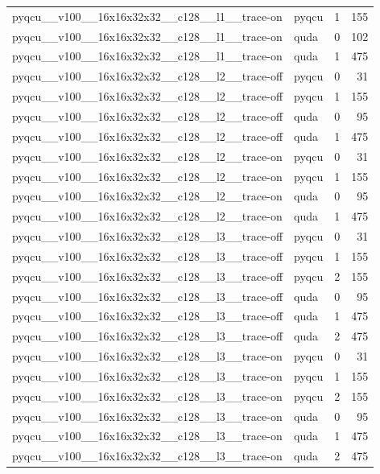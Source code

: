 \begin{table}[htbp]
\begin{tabular}{@{}llrr@{}}
pyqcu\_\_v100\_\_16x16x32x32\_\_c128\_\_l1\_\_trace-on & pyqcu & 1 & 155 \\
pyqcu\_\_v100\_\_16x16x32x32\_\_c128\_\_l1\_\_trace-on & quda & 0 & 102 \\
pyqcu\_\_v100\_\_16x16x32x32\_\_c128\_\_l1\_\_trace-on & quda & 1 & 475 \\
pyqcu\_\_v100\_\_16x16x32x32\_\_c128\_\_l2\_\_trace-off & pyqcu & 0 & 31 \\
pyqcu\_\_v100\_\_16x16x32x32\_\_c128\_\_l2\_\_trace-off & pyqcu & 1 & 155 \\
pyqcu\_\_v100\_\_16x16x32x32\_\_c128\_\_l2\_\_trace-off & quda & 0 & 95 \\
pyqcu\_\_v100\_\_16x16x32x32\_\_c128\_\_l2\_\_trace-off & quda & 1 & 475 \\
pyqcu\_\_v100\_\_16x16x32x32\_\_c128\_\_l2\_\_trace-on & pyqcu & 0 & 31 \\
pyqcu\_\_v100\_\_16x16x32x32\_\_c128\_\_l2\_\_trace-on & pyqcu & 1 & 155 \\
pyqcu\_\_v100\_\_16x16x32x32\_\_c128\_\_l2\_\_trace-on & quda & 0 & 95 \\
pyqcu\_\_v100\_\_16x16x32x32\_\_c128\_\_l2\_\_trace-on & quda & 1 & 475 \\
pyqcu\_\_v100\_\_16x16x32x32\_\_c128\_\_l3\_\_trace-off & pyqcu & 0 & 31 \\
pyqcu\_\_v100\_\_16x16x32x32\_\_c128\_\_l3\_\_trace-off & pyqcu & 1 & 155 \\
pyqcu\_\_v100\_\_16x16x32x32\_\_c128\_\_l3\_\_trace-off & pyqcu & 2 & 155 \\
pyqcu\_\_v100\_\_16x16x32x32\_\_c128\_\_l3\_\_trace-off & quda & 0 & 95 \\
pyqcu\_\_v100\_\_16x16x32x32\_\_c128\_\_l3\_\_trace-off & quda & 1 & 475 \\
pyqcu\_\_v100\_\_16x16x32x32\_\_c128\_\_l3\_\_trace-off & quda & 2 & 475 \\
pyqcu\_\_v100\_\_16x16x32x32\_\_c128\_\_l3\_\_trace-on & pyqcu & 0 & 31 \\
pyqcu\_\_v100\_\_16x16x32x32\_\_c128\_\_l3\_\_trace-on & pyqcu & 1 & 155 \\
pyqcu\_\_v100\_\_16x16x32x32\_\_c128\_\_l3\_\_trace-on & pyqcu & 2 & 155 \\
pyqcu\_\_v100\_\_16x16x32x32\_\_c128\_\_l3\_\_trace-on & quda & 0 & 95 \\
pyqcu\_\_v100\_\_16x16x32x32\_\_c128\_\_l3\_\_trace-on & quda & 1 & 475 \\
pyqcu\_\_v100\_\_16x16x32x32\_\_c128\_\_l3\_\_trace-on & quda & 2 & 475 \\

\end{tabular}
\end{table}
